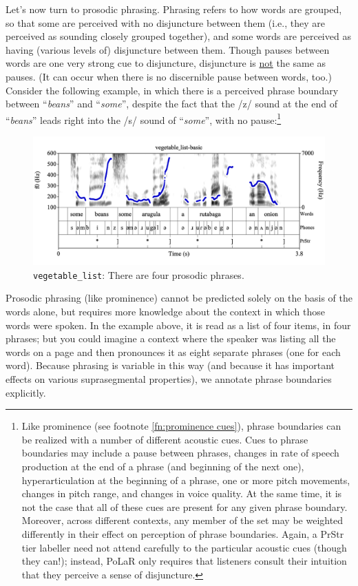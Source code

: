 \documentclass[11pt, twoside]{memoir}
\def\langtext#1{\textit{#1}}
\begin{document}
Let’s now turn to prosodic phrasing. Phrasing refers to how words are grouped, so that some are perceived with no disjuncture between them (i.e., they are perceived as sounding closely grouped together), and some words are perceived as having (various levels of) disjuncture between them. Though pauses between words are one very strong cue to disjuncture, disjuncture is \uline{not} the same as pauses. (It can occur when there is no discernible pause between words, too.) Consider the following example, in which there is a perceived phrase boundary between “\langtext{beans}” and “\langtext{some}”, despite the fact that the /z/ sound at the end of “\langtext{beans}” leads right into the /s/ sound of “\langtext{some}”, with no pause:\footnote{Like prominence (see footnote \ref{fn:prominence cues}), phrase boundaries can be realized with a number of different acoustic cues. Cues to phrase boundaries may include a pause between phrases, changes in rate of speech production at the end of a phrase (and beginning of the next one), hyperarticulation at the beginning of a phrase, one or more pitch movements, changes in pitch range, and changes in voice quality. At the same time, it is not the case that all of these cues are present for any given phrase boundary. Moreover, across different contexts, any member of the set may be weighted differently in their effect on perception of phrase boundaries. Again, a PrStr tier labeller need not attend carefully to the particular acoustic cues (though they can!); instead, PoLaR only requires that listeners consult their intuition that they perceive a sense of disjuncture.\label{fn:phrasing cues}}
\begin{figure}[H]
\centering
\includegraphics[width=.875\linewidth]{PrStr-vegetable_list-basic.png}
\caption{\texttt{vegetable\_list}: There are four prosodic phrases.
\label{fig:vegetable list phrases}
}
\end{figure}
Prosodic phrasing (like prominence) cannot be predicted solely on the basis of the words alone, but requires more knowledge about the context in which those words were spoken. In the example above, it is read as a list of four items, in four phrases; but you could imagine a context where the speaker was listing all the words on a page and then pronounces it as eight separate phrases (one for each word). Because phrasing is variable in this way (and because it has important effects on various suprasegmental properties), we annotate phrase boundaries explicitly.
\end{document}

